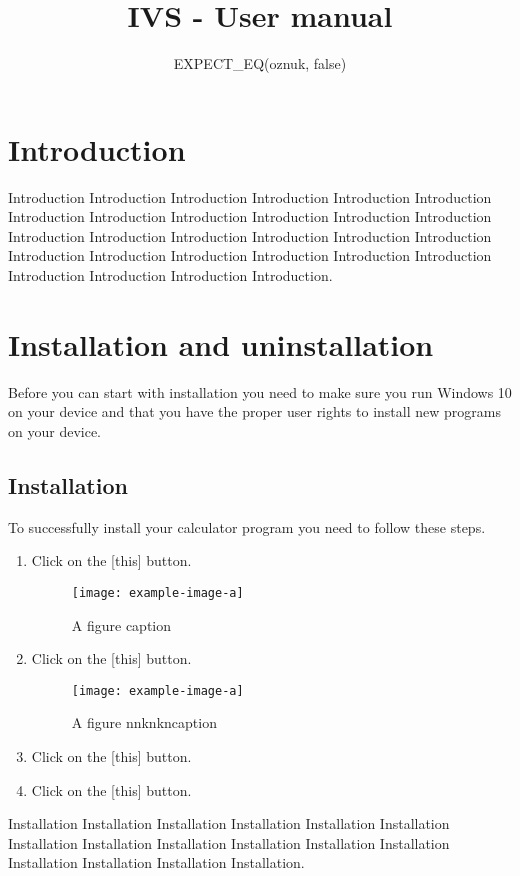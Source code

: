 \documentclass{article}
\title{IVS - User manual}
\author{EXPECT\_EQ(oznuk, false)}
\begin{document}
\maketitle


\section{Introduction}

Introduction Introduction Introduction Introduction Introduction Introduction Introduction Introduction Introduction Introduction Introduction Introduction Introduction Introduction Introduction Introduction Introduction Introduction Introduction Introduction Introduction Introduction Introduction Introduction Introduction Introduction Introduction Introduction.


\section{Installation and uninstallation}
Before you can start with installation you need to make sure you run Windows 10 on your device and that you have the proper user rights to install new programs on your device. 

\subsection{Installation}
To successfully install your calculator program you need to follow these steps.

\begin{enumerate}
\item Click on the [this] button.
  \begin{figure}[H]
    \centering
    \texttt{[image: example-image-a]}
    \caption{A figure caption}
  \end{figure}
  
\item Click on the [this] button.
  \begin{figure}[H]
    \centering
    \texttt{[image: example-image-a]}
    \caption{A figure     nnknkncaption}
  \end{figure}

\item Click on the [this] button.
\item Click on the [this] button.


\end{enumerate}
Installation Installation Installation Installation Installation Installation Installation Installation Installation Installation Installation Installation Installation Installation Installation Installation.
\end{document}
